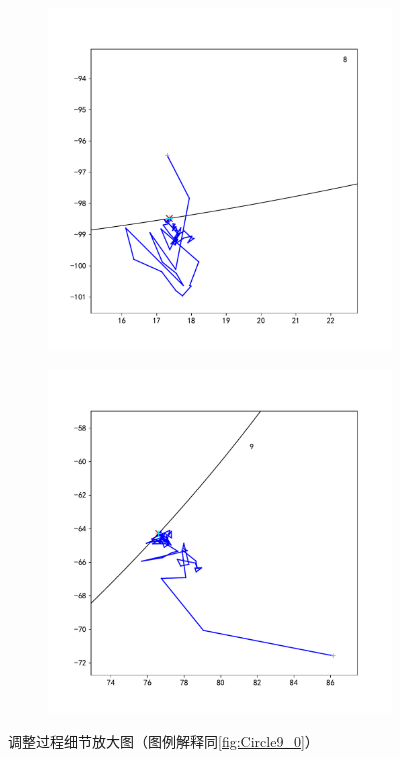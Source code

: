 \documentclass[withoutpreface,bwprint]{cumcmthesis} %
\begin{document}
\begin{figure}[H]
\begin{subfigure}{0.32\linewidth}
    \end{subfigure}
    \begin{subfigure}{0.32\linewidth}
        \includegraphics[width=1.1\linewidth]{figures/c9_8.pdf}
    \end{subfigure}
    \begin{subfigure}{0.32\linewidth}
        \includegraphics[width=1.1\linewidth]{figures/c9_9.pdf}
    \end{subfigure}
    \caption{调整过程细节放大图（图例解释同\ref{fig:Circle9_0}）}
    \label{fig:C9_detail}
\end{figure}
\end{document}

